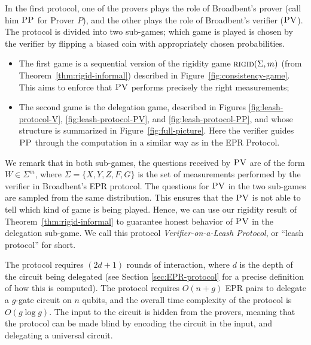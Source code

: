 \documentclass[11pt]{article}
\theoremstyle{remark}
\theoremstyle{definition}
\newcommand{\rigid}{\textsc{rigid}}
\newcommand{\pv}{\textsc{PV}}
\newcommand{\pp}{\textsc{PP}}
\begin{document}
In the first protocol, one of the provers plays the role of Broadbent's prover
(call him $\pp$ for Prover $P$), and the other plays the role of Broadbent's
verifier ($\pv$). The protocol is divided into two sub-games; which game is played is chosen by the verifier by flipping a biased coin with appropriately chosen probabilities.
\begin{itemize}[nolistsep]
\item The first game is a sequential version of the rigidity game $\rigid(\Sigma,m)$ (from Theorem~\ref{thm:rigid-informal}) described in Figure~\ref{fig:consistency-game}. This aims to enforce that $\pv$ performs precisely the right measurements;
\item The second game is the delegation game, described in Figures \ref{fig:leash-protocol-V}, \ref{fig:leash-protocol-PV}, and \ref{fig:leash-protocol-PP}, and whose structure is summarized in Figure~\ref{fig:full-picture}. Here the verifier guides $\pp$ through the computation in a similar way as in the EPR Protocol.
\end{itemize}

We remark that in both sub-games, the questions received by $\pv$ are of the form $W\in \Sigma^m$, where $\Sigma = \{X,Y,Z,F,G\}$ is the set of measurements performed by the verifier in Broadbent's EPR protocol. 
The questions for $\pv$ in the two sub-games are sampled from the same distribution. This ensures that the $\pv$ is not able to tell which kind of game is being played. Hence, we can use our rigidity result of Theorem~\ref{thm:rigid-informal} to guarantee honest behavior of $\pv$ in the delegation sub-game. 
We call this protocol \emph{Verifier-on-a-Leash
Protocol}, or ``leash protocol'' for short.

The protocol requires $(2d+1)$ rounds of interaction, where $d$ is the depth of the circuit being delegated (see Section \ref{sec:EPR-protocol} for a precise definition of how this is computed). %
The protocol requires $O(n+g)$ EPR pairs to delegate a $g$-gate circuit on $n$ qubits, and the overall time complexity of the protocol is $O(g\log g)$.
The input to the circuit is hidden from the provers, meaning that the protocol can be made blind by encoding the circuit in the input, and delegating a universal circuit. 
\end{document}
